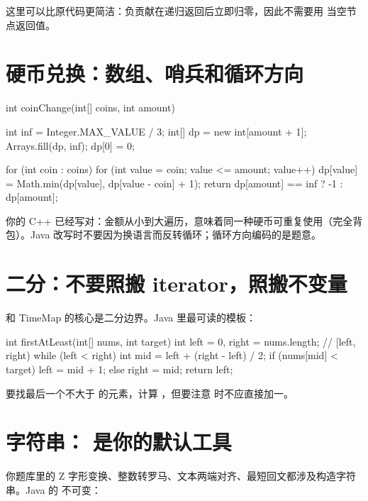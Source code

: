 这里可以比原代码更简洁：负贡献在递归返回后立即归零，因此不需要用  当空节点返回值。

\section{硬币兑换：数组、哨兵和循环方向}

\begin{javacode}
int coinChange(int[] coins, int amount) {
    int inf = Integer.MAX_VALUE / 3;
    int[] dp = new int[amount + 1];
    Arrays.fill(dp, inf);
    dp[0] = 0;

    for (int coin : coins) {
        for (int value = coin; value <= amount; value++) {
            dp[value] = Math.min(dp[value], dp[value - coin] + 1);
        }
    }
    return dp[amount] == inf ? -1 : dp[amount];
}
\end{javacode}

\begin{pitfall}[循环方向不是语法问题]
你的 C++ 已经写对：金额从小到大遍历，意味着同一种硬币可重复使用（完全背包）。Java 改写时不要因为换语言而反转循环；循环方向编码的是题意。
\end{pitfall}

\section{二分：不要照搬 iterator，照搬不变量}

 和 TimeMap 的核心是二分边界。Java 里最可读的模板：

\begin{javacode}
int firstAtLeast(int[] nums, int target) {
    int left = 0, right = nums.length; // [left, right)
    while (left < right) {
        int mid = left + (right - left) / 2;
        if (nums[mid] < target) left = mid + 1;
        else right = mid;
    }
    return left;
}
\end{javacode}

要找最后一个不大于  的元素，计算 ，但要注意  时不应直接加一。

\section{字符串： 是你的默认工具}

你题库里的 Z 字形变换、整数转罗马、文本两端对齐、最短回文都涉及构造字符串。Java 的  不可变：

